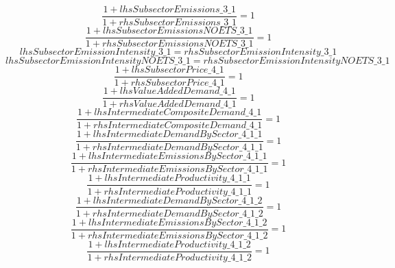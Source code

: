\begin{dmath}
\frac{1+{lhsSubsectorEmissions\_3\_1}}{1+{rhsSubsectorEmissions\_3\_1}}=1
\end{dmath}
\begin{dmath}
\frac{1+{lhsSubsectorEmissionsNOETS\_3\_1}}{1+{rhsSubsectorEmissionsNOETS\_3\_1}}=1
\end{dmath}
\begin{dmath}
{lhsSubsectorEmissionIntensity\_3\_1}={rhsSubsectorEmissionIntensity\_3\_1}
\end{dmath}
\begin{dmath}
{lhsSubsectorEmissionIntensityNOETS\_3\_1}={rhsSubsectorEmissionIntensityNOETS\_3\_1}
\end{dmath}
\begin{dmath}
\frac{1+{lhsSubsectorPrice\_4\_1}}{1+{rhsSubsectorPrice\_4\_1}}=1
\end{dmath}
\begin{dmath}
\frac{1+{lhsValueAddedDemand\_4\_1}}{1+{rhsValueAddedDemand\_4\_1}}=1
\end{dmath}
\begin{dmath}
\frac{1+{lhsIntermediateCompositeDemand\_4\_1}}{1+{rhsIntermediateCompositeDemand\_4\_1}}=1
\end{dmath}
\begin{dmath}
\frac{1+{lhsIntermediateDemandBySector\_4\_1\_1}}{1+{rhsIntermediateDemandBySector\_4\_1\_1}}=1
\end{dmath}
\begin{dmath}
\frac{1+{lhsIntermediateEmissionsBySector\_4\_1\_1}}{1+{rhsIntermediateEmissionsBySector\_4\_1\_1}}=1
\end{dmath}
\begin{dmath}
\frac{1+{lhsIntermediateProductivity\_4\_1\_1}}{1+{rhsIntermediateProductivity\_4\_1\_1}}=1
\end{dmath}
\begin{dmath}
\frac{1+{lhsIntermediateDemandBySector\_4\_1\_2}}{1+{rhsIntermediateDemandBySector\_4\_1\_2}}=1
\end{dmath}
\begin{dmath}
\frac{1+{lhsIntermediateEmissionsBySector\_4\_1\_2}}{1+{rhsIntermediateEmissionsBySector\_4\_1\_2}}=1
\end{dmath}
\begin{dmath}
\frac{1+{lhsIntermediateProductivity\_4\_1\_2}}{1+{rhsIntermediateProductivity\_4\_1\_2}}=1
\end{dmath}
